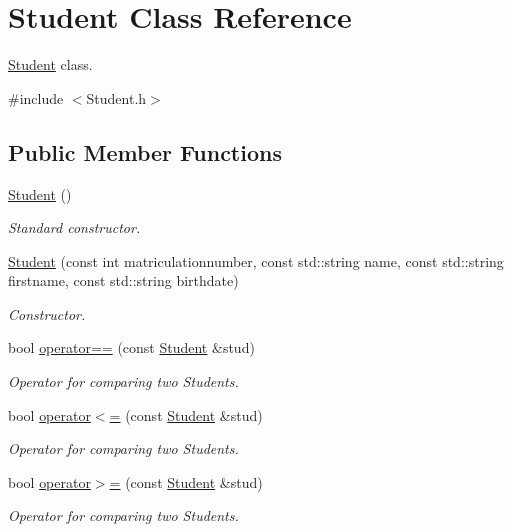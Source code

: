 \hypertarget{class_student}{}\section{Student Class Reference}
\label{class_student}


\hyperlink{class_student}{Student} class.  




{\ttfamily \#include $<$Student.\+h$>$}

\subsection*{Public Member Functions}
\begin{DoxyCompactItemize}
\item 
\hypertarget{class_student_af9168cedbfa5565cf0b20c1a9d3f5c9d}{}\hyperlink{class_student_af9168cedbfa5565cf0b20c1a9d3f5c9d}{Student} ()\label{class_student_af9168cedbfa5565cf0b20c1a9d3f5c9d}

\begin{DoxyCompactList}\small\item\em Standard constructor. \end{DoxyCompactList}\item 
\hyperlink{class_student_a1b85f550b2ac66cc5c0526f0c4b4a83d}{Student} (const int matriculationnumber, const std\+::string name, const std\+::string firstname, const std\+::string birthdate)
\begin{DoxyCompactList}\small\item\em Constructor. \end{DoxyCompactList}\item 
bool \hyperlink{class_student_a4023157958bdbdca27935f3ded2b5258}{operator==} (const \hyperlink{class_student}{Student} \&stud)
\begin{DoxyCompactList}\small\item\em Operator for comparing two Students. \end{DoxyCompactList}\item 
bool \hyperlink{class_student_a26ac75f112a5103217cf31e7bd8d6e9c}{operator$<$=} (const \hyperlink{class_student}{Student} \&stud)
\begin{DoxyCompactList}\small\item\em Operator for comparing two Students. \end{DoxyCompactList}\item 
bool \hyperlink{class_student_a39be9cda43dd5af76987a77ab33b21e3}{operator$>$=} (const \hyperlink{class_student}{Student} \&stud)
\begin{DoxyCompactList}\small\item\em Operator for comparing two Students. \end{DoxyCompactList}\end{DoxyCompactItemize}
